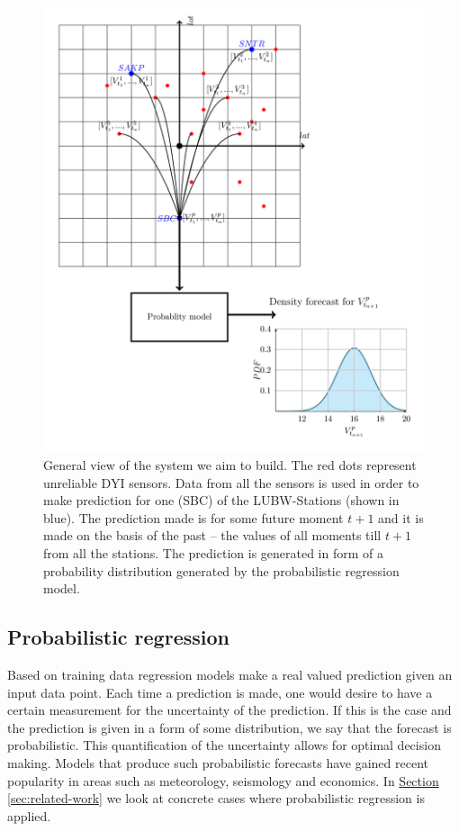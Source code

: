 \documentclass[12pt,a4paper,twoside]{scrartcl}
\numberwithin{equation}{section}
\newcommand{\refsec}[1]{\hyperref[#1]{Section \ref*{#1}}}
\begin{document}
\begin{center}
  \begin{figure}[htbp]
    \centering
    \includegraphics[height=1\textwidth, width=1\textwidth]{figures/general_system.png}
    \caption[General system]{General view of the system we aim to build. The red dots represent unreliable DYI sensors. Data from all the sensors is used in order to make prediction for one (SBC) of the LUBW-Stations (shown in blue). The prediction made is for some future moment \(t+1\) and it is made on the basis of the past -- the values of all moments till \(t+1\) from all the stations. The prediction is generated in form of a probability distribution generated by the probabilistic regression model.}\label{fig:general}
  \end{figure}
\end{center}
\subsection{Probabilistic regression}\label{sec:prob-regression}
Based on training data regression models make a real valued prediction given an input data point. Each time a prediction is made, one would desire to have a certain measurement for the uncertainty of the prediction. If this is the case and the prediction is given in a form of some distribution, we say that the forecast is probabilistic. This quantification of the uncertainty allows for optimal decision making. Models that produce such probabilistic forecasts have gained recent popularity in areas such as meteorology, seismology and economics. In \refsec{sec:related-work} we look at concrete cases where probabilistic regression is applied.
\end{document}
